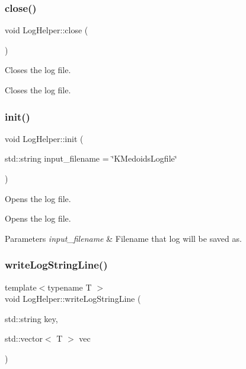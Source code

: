 \subsubsection{\texorpdfstring{close()}{close()}}
{\footnotesize\ttfamily void Log\+Helper\+::close (\begin{DoxyParamCaption}{ }\end{DoxyParamCaption})\hspace{0.3cm}{\ttfamily [inline]}}



Closes the log file. 

Closes the log file. \mbox{\label{structLogHelper_a8bf957fb897ae5b548264f2f614879c5}} 
\subsubsection{\texorpdfstring{init()}{init()}}
{\footnotesize\ttfamily void Log\+Helper\+::init (\begin{DoxyParamCaption}\item[{std\+::string}]{input\+\_\+filename = {\ttfamily \char`\"{}KMedoidsLogfile\char`\"{}} }\end{DoxyParamCaption})\hspace{0.3cm}{\ttfamily [inline]}}



Opens the log file. 

Opens the log file.


\begin{DoxyParams}{Parameters}
{\em input\+\_\+filename} & Filename that log will be saved as. \\
\hline
\end{DoxyParams}
\mbox{\label{structLogHelper_ad1bb80fa2bd8b1dfcd944ea19c4e8e06}} 
\subsubsection{\texorpdfstring{write\+Log\+String\+Line()}{writeLogStringLine()}}
{\footnotesize\ttfamily template$<$typename T $>$ \\
void Log\+Helper\+::write\+Log\+String\+Line (\begin{DoxyParamCaption}\item[{std\+::string}]{key,  }\item[{std\+::vector$<$ T $>$}]{vec }\end{DoxyParamCaption})\hspace{0.3cm}{\ttfamily [inline]}}



